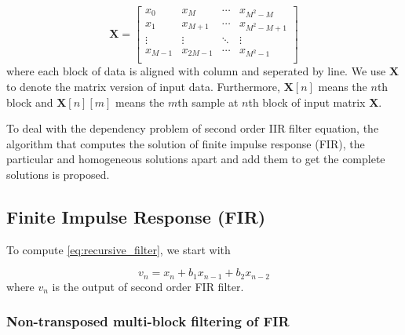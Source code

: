 \begin{equation*}
    \label{eq:matrix_X}
    \bm{X} = \left[\begin{array}{c|c|c|c}
        x_0 & x_M & \cdots & x_{M^2-M} \\ 
        x_1 & x_{M+1} & \cdots & x_{M^2-M+1} \\
        \vdots & \vdots & \ddots & \vdots \\
        x_{M-1} & x_{2M-1} &\cdots & x_{M^2-1} \\
        \end{array}\right]
\end{equation*}
where each block of data is aligned with column and seperated by line.
We use $\bm{X}$ to denote the matrix version of input data. Furthermore, $\bm{X}[n]$
means the $n$th block and $\bm{X}[n][m]$ means the $m$th sample at $n$th block
of input matrix $\bm{X}$.

To deal with the dependency problem of second order IIR filter equation, the algorithm
that computes the solution of finite impulse response (FIR), the particular and homogeneous solutions apart and 
add them to get the complete solutions is proposed.

\subsection{Finite Impulse Response (FIR)}

To compute \eqref{eq:recursive_filter}, we start with 

\begin{equation}
    \label{eq:fir_filter}
    v_n = x_n + b_1x_{n-1} + b_2x_{n-2} 
\end{equation}
where $v_n$ is the output of second order FIR filter. 

\subsubsection{Non-transposed multi-block filtering of FIR}

